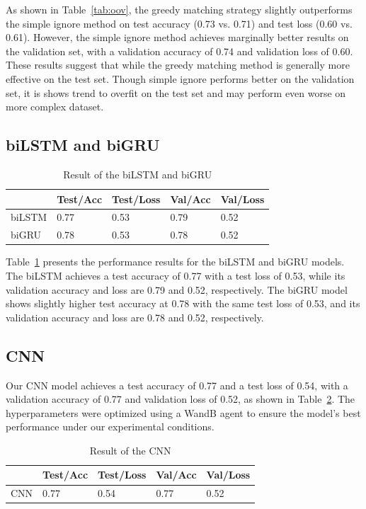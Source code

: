 As shown in Table~\ref{tab:oov}, the greedy matching strategy slightly outperforms the simple ignore method on test accuracy (0.73 vs. 0.71) and test loss (0.60 vs. 0.61). However, the simple ignore method achieves marginally better results on the validation set, with a validation accuracy of 0.74 and validation loss of 0.60. These results suggest that while the greedy matching method is generally more effective on the test set. Though simple ignore performs better on the validation set, it is shows trend to overfit on the test set and may perform even worse on more complex dataset.


\subsection{biLSTM and biGRU}

\begin{table}[h]
\centering
\caption{Result of the biLSTM and biGRU}
\label{tab:bilstm}
\begin{tabular}{l|llll}
\toprule
                & Test/Acc      & Test/Loss     & Val/Acc       & Val/Loss      \\
\midrule
biLSTM & 0.77 & 0.53 & 0.79 & 0.52\\
biGRU & 0.78 & 0.53 & 0.78 & 0.52
\end{tabular}
\end{table}

Table~\ref{tab:bilstm} presents the performance results for the biLSTM and biGRU models. The biLSTM achieves a test accuracy of 0.77 with a test loss of 0.53, while its validation accuracy and loss are 0.79 and 0.52, respectively. The biGRU model shows slightly higher test accuracy at 0.78 with the same test loss of 0.53, and its validation accuracy and loss are 0.78 and 0.52, respectively.

\subsection{CNN}

Our CNN model achieves a test accuracy of 0.77 and a test loss of 0.54, with a validation accuracy of 0.77 and validation loss of 0.52, as shown in Table~\ref{tab:cnn}. The hyperparameters were optimized using a WandB agent to ensure the model’s best performance under our experimental conditions.

\begin{table}[h]
\centering
\caption{Result of the CNN}
\label{tab:cnn}
\begin{tabular}{l|llll}
\toprule
                & Test/Acc      & Test/Loss     & Val/Acc       & Val/Loss      \\
\midrule
CNN & 0.77 & 0.54 & 0.77 & 0.52
\end{tabular}
\end{table}

